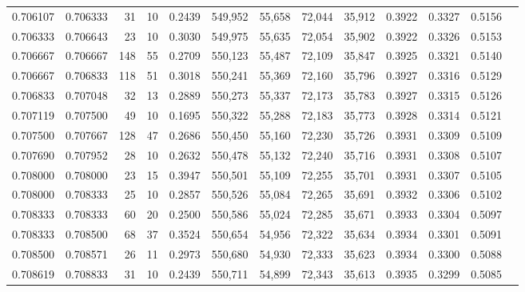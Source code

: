 \begin{tabular}{rrrrrrrrrrrrr}
0.706107 & 0.706333 &    31 &  10 &                                     0.2439 & 549,952 &  55,658 &  72,044 &  35,912 & 0.3922 & 0.3327 & 0.5156 \\
0.706333 & 0.706643 &    23 &  10 &                                     0.3030 & 549,975 &  55,635 &  72,054 &  35,902 & 0.3922 & 0.3326 & 0.5153 \\
0.706667 & 0.706667 &   148 &  55 &                                     0.2709 & 550,123 &  55,487 &  72,109 &  35,847 & 0.3925 & 0.3321 & 0.5140 \\
0.706667 & 0.706833 &   118 &  51 &                                     0.3018 & 550,241 &  55,369 &  72,160 &  35,796 & 0.3927 & 0.3316 & 0.5129 \\
0.706833 & 0.707048 &    32 &  13 &                                     0.2889 & 550,273 &  55,337 &  72,173 &  35,783 & 0.3927 & 0.3315 & 0.5126 \\
0.707119 & 0.707500 &    49 &  10 &                                     0.1695 & 550,322 &  55,288 &  72,183 &  35,773 & 0.3928 & 0.3314 & 0.5121 \\
0.707500 & 0.707667 &   128 &  47 &                                     0.2686 & 550,450 &  55,160 &  72,230 &  35,726 & 0.3931 & 0.3309 & 0.5109 \\
0.707690 & 0.707952 &    28 &  10 &                                     0.2632 & 550,478 &  55,132 &  72,240 &  35,716 & 0.3931 & 0.3308 & 0.5107 \\
0.708000 & 0.708000 &    23 &  15 &                                     0.3947 & 550,501 &  55,109 &  72,255 &  35,701 & 0.3931 & 0.3307 & 0.5105 \\
0.708000 & 0.708333 &    25 &  10 &                                     0.2857 & 550,526 &  55,084 &  72,265 &  35,691 & 0.3932 & 0.3306 & 0.5102 \\
0.708333 & 0.708333 &    60 &  20 &                                     0.2500 & 550,586 &  55,024 &  72,285 &  35,671 & 0.3933 & 0.3304 & 0.5097 \\
0.708333 & 0.708500 &    68 &  37 &                                     0.3524 & 550,654 &  54,956 &  72,322 &  35,634 & 0.3934 & 0.3301 & 0.5091 \\
0.708500 & 0.708571 &    26 &  11 &                                     0.2973 & 550,680 &  54,930 &  72,333 &  35,623 & 0.3934 & 0.3300 & 0.5088 \\
0.708619 & 0.708833 &    31 &  10 &                                     0.2439 & 550,711 &  54,899 &  72,343 &  35,613 & 0.3935 & 0.3299 & 0.5085 \\

\end{tabular}
